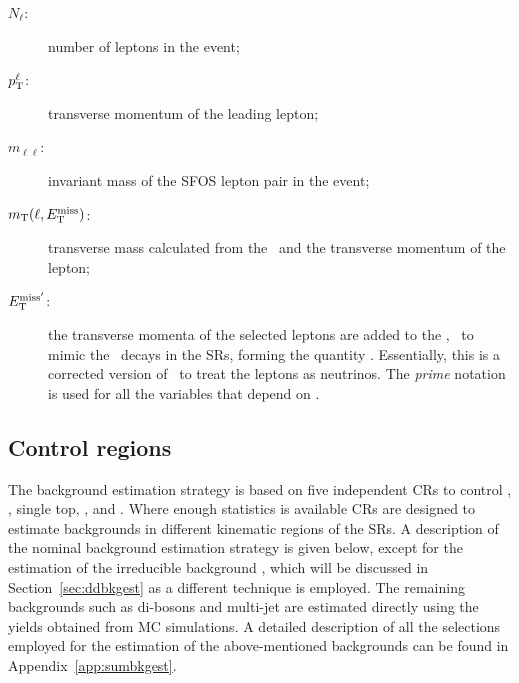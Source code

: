 		\begin{description}
			\item[\boldmath $N_{\ell}$:] number of leptons in the event;
			\item[\boldmath $p_{\mathrm{T}}^{\ell}$:] transverse momentum of the leading lepton;
			\item[\boldmath $m_{\ell\ell}$:] invariant mass of the \ac{SFOS} lepton pair in the event;
			\item[\boldmath $m_{\mathrm{T}}(\ell,E_{\mathrm{T}}^{\mathrm{miss}})$:] transverse mass calculated from the \met\ and the transverse momentum of the lepton;  
			\item[\boldmath $E_{\mathrm{T}}^{\mathrm{miss'}}$:] the transverse momenta of the selected leptons are added to the \ptmiss, \eg\ to mimic the \Znunu\ decays in the \acp{SR}, forming the quantity \metprime. Essentially, this is a corrected version of \met\ to treat the leptons as neutrinos. The \emph{prime} notation is used for all the variables that depend on \metprime.
		\end{description}


		\subsection{Control regions}
		\label{subsec:crs}

			The background estimation strategy is based on five independent \acp{CR} to control \Zjets, \ttbar, single top, \Wjets, and \ttZ. Where enough statistics is available \acp{CR} are designed to estimate backgrounds in different kinematic regions of the \acp{SR}. A description of the nominal background estimation strategy is given below, except for the estimation of the irreducible background \ttZ, which will be discussed in Section~\ref{sec:ddbkgest} as a different technique is employed. The remaining backgrounds such as di-bosons and multi-jet are estimated directly using the yields obtained from \ac{MC} simulations. A detailed description of all the selections employed for the estimation of the above-mentioned backgrounds can be found in Appendix~\ref{app:sumbkgest}. 

